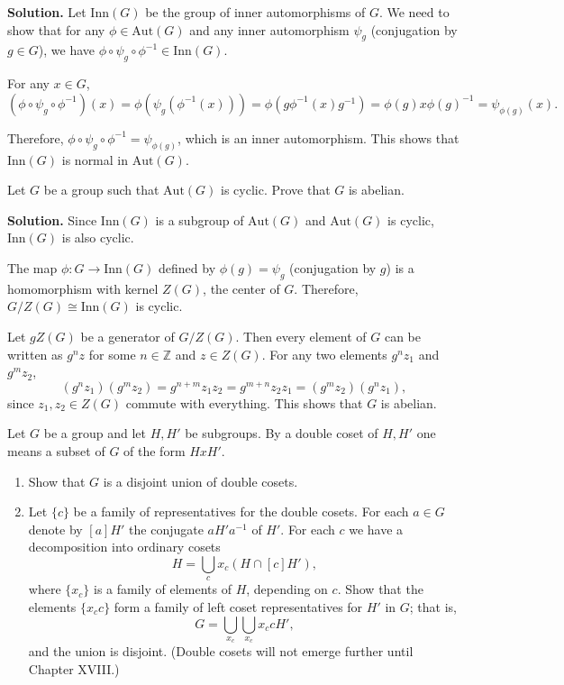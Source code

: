 \noindent\textbf{Solution.} Let $\text{Inn}(G)$ be the group of inner automorphisms of $G$. We need to show that for any $\phi \in \text{Aut}(G)$ and any inner automorphism $\psi_g$ (conjugation by $g \in G$), we have $\phi \circ \psi_g \circ \phi^{-1} \in \text{Inn}(G)$.

For any $x \in G$,
\[(\phi \circ \psi_g \circ \phi^{-1})(x) = \phi(\psi_g(\phi^{-1}(x))) = \phi(g\phi^{-1}(x)g^{-1}) = \phi(g)x\phi(g)^{-1} = \psi_{\phi(g)}(x).\]

Therefore, $\phi \circ \psi_g \circ \phi^{-1} = \psi_{\phi(g)}$, which is an inner automorphism. This shows that $\text{Inn}(G)$ is normal in $\text{Aut}(G)$.

\begin{problembox}
Let $G$ be a group such that $\text{Aut}(G)$ is cyclic. Prove that $G$ is abelian.
\end{problembox}

\noindent\textbf{Solution.} Since $\text{Inn}(G)$ is a subgroup of $\text{Aut}(G)$ and $\text{Aut}(G)$ is cyclic, $\text{Inn}(G)$ is also cyclic.

The map $\phi: G \to \text{Inn}(G)$ defined by $\phi(g) = \psi_g$ (conjugation by $g$) is a homomorphism with kernel $Z(G)$, the center of $G$. Therefore, $G/Z(G) \cong \text{Inn}(G)$ is cyclic.

Let $gZ(G)$ be a generator of $G/Z(G)$. Then every element of $G$ can be written as $g^nz$ for some $n \in \mathbb{Z}$ and $z \in Z(G)$. For any two elements $g^nz_1$ and $g^mz_2$,
\[(g^nz_1)(g^mz_2) = g^{n+m}z_1z_2 = g^{m+n}z_2z_1 = (g^mz_2)(g^nz_1),\]
since $z_1, z_2 \in Z(G)$ commute with everything. This shows that $G$ is abelian.

\begin{problembox}
Let $G$ be a group and let $H, H'$ be subgroups. By a double coset of $H, H'$ one means a subset of $G$ of the form $HxH'$.
\begin{enumerate}[label=(\alph*)]
\item Show that $G$ is a disjoint union of double cosets.
\item Let $\{c\}$ be a family of representatives for the double cosets. For each $a \in G$ denote by $[a]H'$ the conjugate $aH'a^{-1}$ of $H'$. For each $c$ we have a decomposition into ordinary cosets
\[H = \bigcup_{c}x_c(H \cap [c]H'),\]
where $\{x_c\}$ is a family of elements of $H$, depending on $c$. Show that the elements $\{x_c c\}$ form a family of left coset representatives for $H'$ in $G$; that is,
\[G = \bigcup_{x_c}\bigcup_{x_c}x_c cH',\]
and the union is disjoint. (Double cosets will not emerge further until Chapter XVIII.)
\end{enumerate}
\end{problembox}

